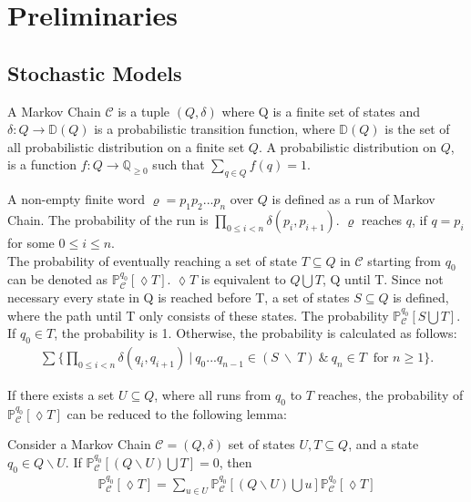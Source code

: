 \section{Preliminaries}
\label{sec:preliminaries}

\subsection{Stochastic Models}
\label{sec:Stochastic Models}

\begin{definition}
\label{def:Markov Chains}
A Markov Chain $\mathcal{C}$ is a tuple $(Q, \delta)$ where Q is a finite set of states and 
$\delta: Q \rightarrow \mathbb{D}(Q)$ is a probabilistic transition function, where 
$\mathbb{D}(Q)$ is the set of all probabilistic distribution on a finite set $Q$. A probabilistic distribution on 
$Q$, is a function $f: Q\rightarrow\mathbb{Q}_{\geq0}$ such that $\sum_{q\in Q}f(q)=1$. 
\end{definition}

\noindent
A non-empty finite word $\varrho = p_1p_2...p_n$ over $Q$ is defined as a run of Markov Chain. 
The probability of the run is $\prod_{0\leq i < n}\delta(p_i,p_{i+1})$. 
$\varrho$ reaches $q$, if $q = p_i$ for some $0\leq i\leq n$. 
\newline
\\
The probability of eventually reaching a set of state $T\subseteq Q$ 
in $\mathcal{C}$ starting from $q_0$ can be denoted as $\mathbb{P}^{q_0}_\mathcal{C}[\lozenge T]$. $\lozenge T$ is 
equivalent to $Q\bigcup T$, Q until T. Since not necessary every state in Q is reached before T, 
a set of states $S\subseteq Q$ is defined, where the path until T only consists of these states.
The probability $\mathbb{P}^{q_0}_\mathcal{C}[S\bigcup T]$. If $q_0 \in T$, 
the probability is 1. Otherwise, the probability is calculated as follows: 
\begin{align*}
    \sum\biggl\{ \prod_{0\leq i< n}\delta(q_i,q_{i+1}) ~|~ q_0...q_{n-1}\in (S~\backslash~ T) ~\&~ q_n 
    \in T\ \text{ for } n\geq 1\biggr\}.
\end{align*}

\noindent
If there exists a set $U\subseteq Q$, where all runs from $q_0$ to $T$ reaches, the probability of 
$\mathbb{P}^{q_0}_\mathcal{C}[\lozenge T]$ can be reduced to the following lemma:  

\begin{lemma}
\label{lemma 1}
Consider a Markov Chain $\mathcal{C}=(Q,\delta)$ set of states $U,T\subseteq Q$, and a state $q_0\in Q\backslash U$. 
If $\mathbb{P}^{q_0}_\mathcal{C}[(Q\backslash U)\bigcup T]=0$, then 
\begin{align*}
    \mathbb{P}^{q_0}_\mathcal{C}[\lozenge T] = \sum_{u\in U}\mathbb{P}^{q_0}_\mathcal{C}[(Q\backslash U) \bigcup u]
    \mathbb{P}^{q_0}_\mathcal{C}[\lozenge T]
\end{align*}
\end{lemma}


